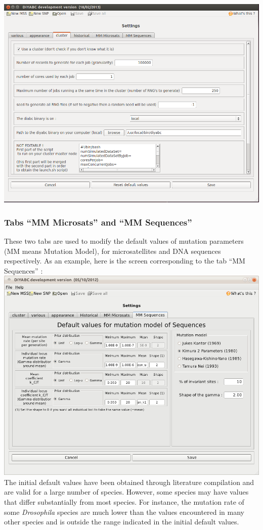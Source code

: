 \includegraphics[scale=0.33]{gui_pictures/Capture-DIYABC-cluster}
\\



\subsubsection{Tabs \textsf{``MM Microsats''} and \textsf{``MM Sequences''}}

These two tabs are used to modify the default values of mutation parameters
(MM means Mutation Model), for microsatellites and DNA sequences respectively.
As an example, here is the screen corresponding to the tab \textsf{``MM
Sequences''} : \\


\includegraphics[scale=0.33]{gui_pictures/Capture-DIYABC-102} \\


The initial default values have been obtained through literature compilation
and are valid for a large number of species. However, some species
may have values that differ substantially from most species. For instance,
the mutation rate of some \emph{Drosophila} species are much lower
than the values encountered in many other species \citep{SMA1997,VPAD2000}
and is outside the range indicated in the initial default values.
